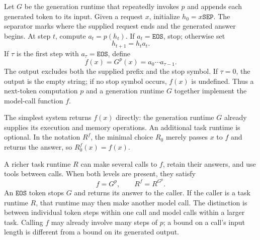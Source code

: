 \documentclass[11pt,twoside]{article}
\newcommand{\eos}{\mathtt{EOS}}
\newcommand{\sep}{\mathtt{SEP}}
\theoremstyle{definition}
\theoremstyle{remark}
\begin{document}
Let $G$ be the generation runtime that repeatedly invokes $p$ and appends
each generated token to its input. Given a request $x$, initialize
$h_0=x\sep$. The separator marks where the supplied request ends and the
generated answer begins. At step $t$, compute $a_t=p(h_t)$. If $a_t=\eos$, stop;
otherwise set
\begin{equation}
 h_{t+1}=h_ta_t.
 \label{eq:append}
\end{equation}
If $\tau$ is the first step with $a_\tau=\eos$, define
\begin{equation}
 f(x)=G^p(x)=a_0\cdots a_{\tau-1}.
 \label{eq:generated-call}
\end{equation}
The output excludes both the supplied prefix and the stop symbol. If
$\tau=0$, the output is the empty string; if no stop symbol occurs,
$f(x)$ is undefined. Thus a next-token computation $p$ and a generation
runtime $G$ together implement the model-call function $f$.

The simplest system returns $f(x)$ directly: the generation runtime $G$
already supplies its execution and memory operations. An additional task
runtime is optional. In the notation $R^f$, the minimal choice $R_0$ merely
passes $x$ to $f$ and returns the answer, so $R_0^f(x)=f(x)$.

A richer task runtime $R$ can make several calls to $f$, retain their
answers, and use tools between calls. When both levels are present, they satisfy
\begin{equation}
 f=G^p,\qquad R^f=R^{G^p}.
 \label{eq:nested-runtimes}
\end{equation}
An $\eos$ token stops $G$ and returns its answer to the caller. If the caller
is a task runtime $R$, that runtime may then make another model call.
The distinction is between individual token steps within one call and
model calls within a larger task. Calling $f$ may already involve many
steps of $p$; a bound on a call's input length is different from a bound
on its generated output.
\end{document}
